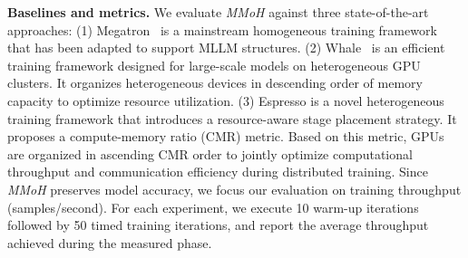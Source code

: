 \documentclass[conference]{IEEEtran}
\begin{document}
\textbf{Baselines and metrics.}
We evaluate \textit{MMoH} against three state-of-the-art approaches:
(1) Megatron~\cite{shoeybi2019megatron} is a mainstream homogeneous training framework that has been adapted to support MLLM structures. 
(2) Whale~\cite{jia2022whale} is an efficient training framework designed for large-scale models on heterogeneous GPU clusters.
It organizes heterogeneous devices in descending order of memory capacity to optimize resource utilization.
(3) Espresso\cite{zhouespresso} is a novel heterogeneous training framework that introduces a resource-aware stage placement strategy. It proposes a compute-memory ratio (CMR) metric.
Based on this metric, GPUs are organized in ascending CMR order to jointly optimize computational throughput and communication efficiency during distributed training.
Since \textit{MMoH} preserves model accuracy, we focus our evaluation on training throughput (samples/second). For each experiment, we execute 10 warm-up iterations followed by 50 timed training iterations, and report the average throughput achieved during the measured phase.
\end{document}

